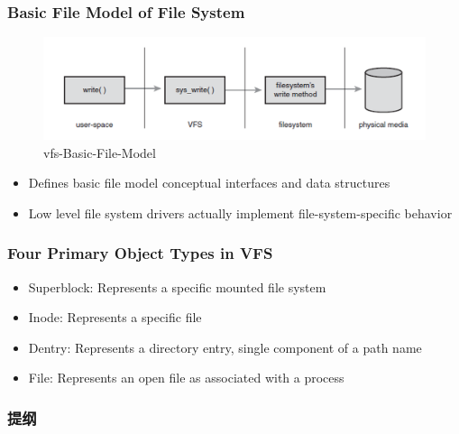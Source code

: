 \begin{frame}[fragile]
    \frametitle{Basic File Model of File System}

% 
  \begin{figure}
    \centering
    \includegraphics[width=0.5\linewidth]{figs/vfs-Basic-File-Model.png}
		\caption{vfs-Basic-File-Model}
	\end{figure}



    \begin{itemize}
        \item Defines basic file model conceptual interfaces and data structures
        \item Low level file system drivers actually implement file-system-specific behavior
    \end{itemize}
% 
\end{frame}
\begin{frame}[fragile]
    \frametitle{Four Primary Object Types in VFS}


    \begin{itemize}
        \item Superblock: Represents a specific mounted file system
        \item Inode: Represents a specific file
        \item Dentry: Represents a directory entry, single component of a path name
        \item File: Represents an open file as associated with a process
    \end{itemize}
% 
\end{frame}
\begin{frame}
\frametitle{提纲} %
\tableofcontents %
\end{frame}
